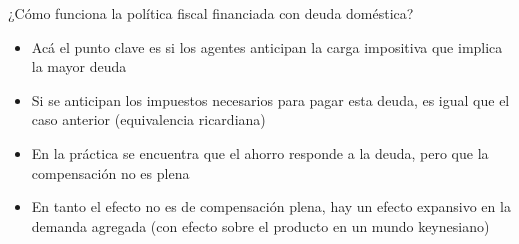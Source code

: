 \documentclass{beamer}
\begin{document}
\begin{frame}{¿Cómo funciona la política fiscal financiada con deuda doméstica?}

    \begin{itemize}
    \item Acá el punto clave es si los agentes anticipan la carga impositiva que implica la mayor deuda
    \item Si se anticipan los impuestos necesarios para pagar esta deuda, es igual que el caso anterior (equivalencia ricardiana)
    \item En la práctica se encuentra que el ahorro responde a la deuda, pero que la compensación no es plena
    \item En tanto el efecto no es de compensación plena, hay un efecto expansivo en la demanda agregada (con efecto sobre el producto en un mundo keynesiano)

    \end{itemize}

\end{frame}





\end{document}
